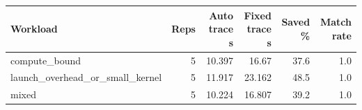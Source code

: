 \begin{tabular}{lrrrrr}
\hline
Workload & Reps & Auto trace s & Fixed trace s & Saved \% & Match rate \\
\hline
compute_bound & 5 & 10.397 & 16.67 & 37.6 & 1.0 \\
launch_overhead_or_small_kernel & 5 & 11.917 & 23.162 & 48.5 & 1.0 \\
mixed & 5 & 10.224 & 16.807 & 39.2 & 1.0 \\
\hline
\end{tabular}
